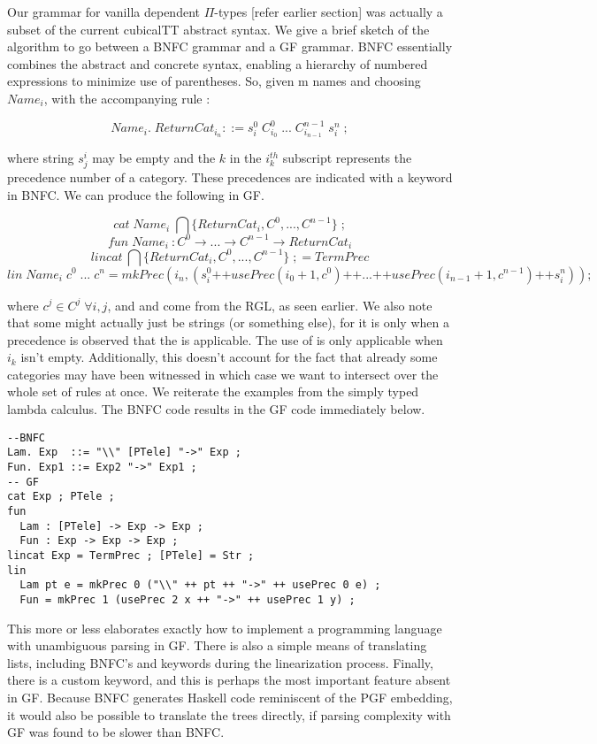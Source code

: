 Our grammar for vanilla dependent $\Pi$-types [refer earlier section] was actually
a subset of the current cubicalTT abstract syntax. We give a brief sketch of the
algorithm to go between a BNFC grammar and a GF grammar. BNFC essentially
combines the abstract and concrete syntax, enabling a hierarchy of numbered
expressions  to minimize use of parentheses. So, given m names and
choosing $Name_i$, with the accompanying rule :

$$Name_i.\; ReturnCat_{i_n} ::= s^0_{i}\;C^0_{i_0}\;...\;C^{n-1}_{i_{n-1}}\;s^n_{i}\;;$$

where string $s^i_j$ may be empty and the $k$ in the $i^{th}_k$ subscript represents the 
precedence number of a category. These precedences are indicated with a
 keyword in BNFC. We can produce the following in GF.

$$cat\; Name_i\; \bigcap\{ReturnCat_i,C^0,..., C^{n-1}\}\;;$$
$$fun\; Name_i\:{:} C^0 \rightarrow ... \rightarrow C^{n-1} \rightarrow ReturnCat_i $$
$$lincat \: \bigcap\{ReturnCat_i,C^0,..., C^{n-1}\}\;; = TermPrec$$
$$lin \; Name_i\;c^0\;... \;c^n = mkPrec(i_n,(s^0_{i}\texttt{++}usePrec(i_0+1,c^0)\texttt{++}...\texttt{++}usePrec(i_{n-1}+1,c^{n-1})\texttt{++}s^n_{i})) ;$$

where $c^j \in C^j \; \forall i,j$, and  and  come
from the RGL, as seen earlier. We also note that some  might
actually just be strings (or something else), for it is only when a precedence
is observed that the  is applicable. The use of
 is only applicable when $i_k$ isn't empty. Additionally, this
doesn't account for the fact that already some categories may have been
witnessed in which case we want to intersect over the whole set of rules at
once. We reiterate the examples from the simply typed lambda calculus. The BNFC
code results in the GF code immediately below.

\begin{verbatim}
--BNFC
Lam. Exp  ::= "\\" [PTele] "->" Exp ;
Fun. Exp1 ::= Exp2 "->" Exp1 ;
-- GF
cat Exp ; PTele ;
fun
  Lam : [PTele] -> Exp -> Exp ;
  Fun : Exp -> Exp -> Exp ;
lincat Exp = TermPrec ; [PTele] = Str ;
lin 
  Lam pt e = mkPrec 0 ("\\" ++ pt ++ "->" ++ usePrec 0 e) ;
  Fun = mkPrec 1 (usePrec 2 x ++ "->" ++ usePrec 1 y) ;
\end{verbatim}

This more or less elaborates exactly how to implement a programming language
with unambiguous parsing in GF. There is also a simple means of translating
lists, including BNFC's  and  keywords during
the linearization process. Finally, there is a custom  keyword, and
this is perhaps the most important feature absent in GF.
Because BNFC generates Haskell code reminiscent of the PGF embedding, it would
also be possible to translate the trees directly, if parsing complexity with GF
was found to be slower than BNFC.

